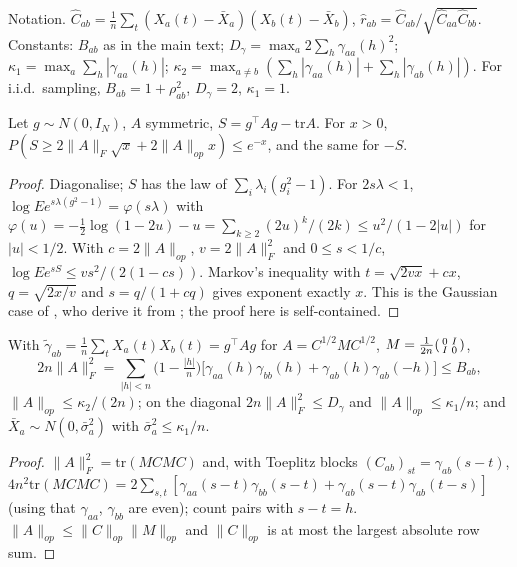 Notation. $\hat C_{ab}=\frac1n\sum_t(X_a(t)-\bar X_a)(X_b(t)-\bar X_b)$,
$\hat r_{ab}=\hat C_{ab}/\sqrt{\hat C_{aa}\hat C_{bb}}$. Constants:
$B_{ab}$ as in the main text; $D_\gamma=\max_a2\sum_h\gamma_{aa}(h)^2$;
$\kappa_1=\max_a\sum_h|\gamma_{aa}(h)|$;
$\kappa_2=\max_{a\ne b}(\sum_h|\gamma_{aa}(h)|+\sum_h|\gamma_{ab}(h)|)$. For
i.i.d.\ sampling, $B_{ab}=1+\rho_{ab}^2$, $D_\gamma=2$, $\kappa_1=1$.

\begin{lemma}\label{lem:chaos}
Let $g\sim N(0,I_N)$, $A$ symmetric, $S=g^\top Ag-\mathrm{tr}A$. For $x>0$,
$P(S\ge2\|A\|_F\sqrt x+2\|A\|_{op}x)\le e^{-x}$, and the same for $-S$.
\end{lemma}
\begin{proof}
Diagonalise; $S$ has the law of $\sum_i\lambda_i(g_i^2-1)$. For $2s\lambda<1$,
$\log Ee^{s\lambda(g^2-1)}=\varphi(s\lambda)$ with
$\varphi(u)=-\frac12\log(1-2u)-u=\sum_{k\ge2}(2u)^k/(2k)\le u^2/(1-2|u|)$ for
$|u|<1/2$. With $c=2\|A\|_{op}$, $v=2\|A\|_F^2$ and $0\le s<1/c$,
$\log Ee^{sS}\le vs^2/(2(1-cs))$. Markov's inequality with $t=\sqrt{2vx}+cx$,
$q=\sqrt{2x/v}$ and $s=q/(1+cq)$ gives exponent exactly $x$. This is the
Gaussian case of \citet[Prop.~1]{hsu2012tail}, who derive it from
\citet{laurent2000adaptive}; the proof here is self-contained.
\end{proof}

\begin{lemma}\label{lem:var}
With $\tilde\gamma_{ab}=\frac1n\sum_tX_a(t)X_b(t)=g^\top Ag$ for
$A=C^{1/2}MC^{1/2}$, $M=\frac1{2n}\begin{psmallmatrix}0&I\\I&0\end{psmallmatrix}$,
\[
2n\|A\|_F^2=\sum_{|h|<n}\Big(1-\tfrac{|h|}{n}\Big)\big[\gamma_{aa}(h)\gamma_{bb}(h)+\gamma_{ab}(h)\gamma_{ab}(-h)\big]\le B_{ab},
\]
$\|A\|_{op}\le\kappa_2/(2n)$; on the diagonal $2n\|A\|_F^2\le D_\gamma$ and
$\|A\|_{op}\le\kappa_1/n$; and $\bar X_a\sim N(0,\bar\sigma_a^2)$ with
$\bar\sigma_a^2\le\kappa_1/n$.
\end{lemma}
\begin{proof}
$\|A\|_F^2=\mathrm{tr}(MCMC)$ and, with Toeplitz blocks
$(C_{ab})_{st}=\gamma_{ab}(s-t)$,
$4n^2\mathrm{tr}(MCMC)=2\sum_{s,t}[\gamma_{aa}(s-t)\gamma_{bb}(s-t)+\gamma_{ab}(s-t)\gamma_{ab}(t-s)]$
(using that $\gamma_{aa}$, $\gamma_{bb}$ are even); count pairs with $s-t=h$.
$\|A\|_{op}\le\|C\|_{op}\|M\|_{op}$ and $\|C\|_{op}$ is at most the largest
absolute row sum.
\end{proof}

